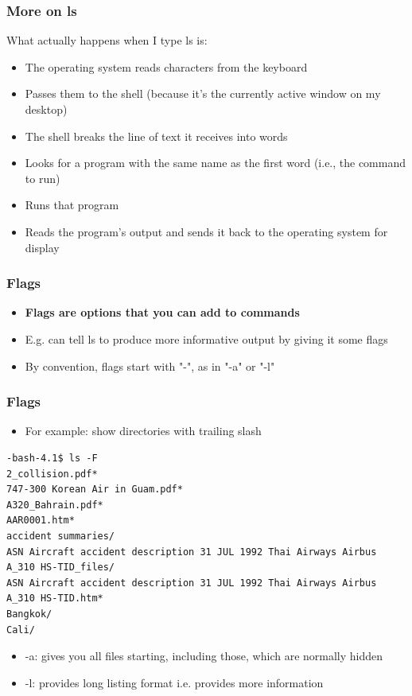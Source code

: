 \documentclass{beamer}
\begin{document}
\begin{frame}[fragile]\frametitle{More on ls}
What actually happens when I type ls is:
\begin{itemize}
    \item The operating system reads characters from the keyboard
    \item Passes them to the shell (because it's the currently active window on my desktop)
    \item The shell breaks the line of text it receives into words
    \item Looks for a program with the same name as the first word (i.e., the command to run)
    \item Runs that program
    \item Reads the program's output and sends it back to the operating system for display
\end{itemize}
\end{frame}

\begin{frame}[fragile]\frametitle{Flags}
\begin{itemize}
\item \textbf{Flags are options that you can add to commands}
\bigskip
\item E.g. can tell ls to produce more informative output by giving it some flags
\item By convention, flags start with "-", as in "-a" or "-l"
\end{itemize}
\end{frame}


\begin{frame}[fragile]\frametitle{Flags}
\begin{itemize}
\item For example: show directories with trailing slash
\end{itemize}
\begin{block}{}
\begin{lstlisting}
-bash-4.1$ ls -F
2_collision.pdf*
747-300 Korean Air in Guam.pdf*
A320_Bahrain.pdf*
AAR0001.htm*
accident summaries/
ASN Aircraft accident description 31 JUL 1992 Thai Airways Airbus A_310 HS-TID_files/
ASN Aircraft accident description 31 JUL 1992 Thai Airways Airbus A_310 HS-TID.htm*
Bangkok/
Cali/
\end{lstlisting}
\end{block}
\begin{itemize}
\item -a: gives you all files starting, including those, which are normally hidden
\item -l: provides long listing format i.e. provides more information
\end{itemize}
\end{frame}
\end{document}
